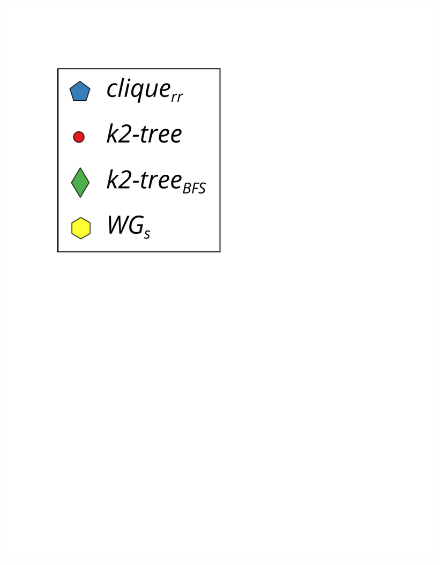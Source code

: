 \begin{figure}
\begin{minipage}{1\textwidth}
\begin{minipage}{0.45\textwidth}
\begin{minipage}{0.2\textwidth}
    				\includegraphics[scale=.2, clip, trim=60 194 0 0]{img/bpeTimes/labelSec.pdf}
    			\end{minipage}
    			

\end{minipage}
\end{minipage}
\end{figure}
